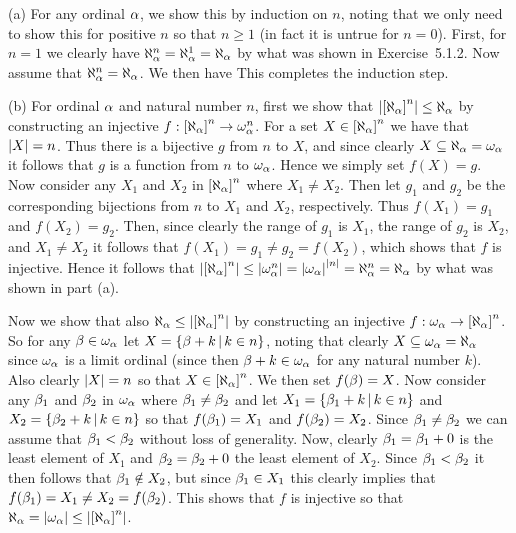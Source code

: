 \begin{solution}
    \newcommand\nss[1]{\squares{\al_\a}^{#1}}
    \def\wss{\squares{\al_\a}^{<\w}}
	(a) For any ordinal $\alpha$, we show this by induction on $n$, noting that we only need to show this for positive $n$ so that $n \geq 1$ (in fact it is untrue for $n=0$).
    First, for $n=1$ we clearly have $\aleph_\alpha^n = \aleph_\alpha^1 = \aleph_\alpha$ by what was shown in Exercise~5.1.2.
    Now assume that $\aleph_\alpha^n = \aleph_\alpha$.
    We then have
    This completes the induction step. \qedsymbol

    (b) For ordinal $\alpha$ and natural number $n$, first we show that $\abs{\nss{n}} \leq \al_\a$ by constructing an injective $f : \nss{n} \to \w_\a^n$.
    For a set $X \in \nss{n}$ we have that $\left| X \right| = n$.
    Thus there is a bijective $g$ from $n$ to $X$, and since clearly $X \subseteq \aleph_\alpha = \omega_\alpha$ it follows that $g$ is a function from $n$ to $\omega_\alpha$.
    Hence we simply set $f(X) = g$.
    Now consider any $X_1$ and $X_2$ in $\nss{n}$ where $X_1 \neq X_2$.
    Then let $g_1$ and $g_2$ be the corresponding bijections from $n$ to $X_1$ and $X_2$, respectively.
    Thus $f(X_1) = g_1$ and $f(X_2) = g_2$.
    Then, since clearly the range of $g_1$ is $X_1$, the range of $g_2$ is $X_2$, and $X_1 \neq X_2$ it follows that $f(X_1) = g_1 \neq g_2 = f(X_2)$, which shows that $f$ is injective.
    Hence it follows that $\abs{\nss{n}} \leq \abs{\w_\a^n} = \abs{\w_\a}^{\abs{n}} = \al_\a^n = \al_\a$ by what was shown in part (a).

    Now we show that also $\al_\a \leq \abs{\nss{n}}$ by constructing an injective $f : \w_\a \to \nss{n}$.
    So for any $\beta \in \omega_\alpha$ let $X = \left\{ \beta + k \,|\, k \in n \right\}$, noting that clearly $X \subseteq \omega_\alpha = \aleph_\alpha$ since $\omega_\alpha$ is a limit ordinal (since then $\beta + k \in \omega_\alpha$ for any natural number $k$).
    Also clearly $\left| X \right| = n$ so that $X \in \nss{n}$.
    We then set $f(\beta) = X$.
    Now consider any $\beta_1$ and $\beta_2$ in $\omega_\alpha$ where $\beta_1 \neq \beta_2$ and let $X_1 = \left\{ \beta_1 + k \,|\, k \in n \right\}$ and $X_2 = \left\{ \beta_2 + k \,|\, k \in n \right\}$ so that $f(\beta_1) = X_1$ and $f(\beta_2) = X_2$.
    Since $\beta_1 \neq \beta_2$ we can assume that $\beta_1 < \beta_2$ without loss of generality.
    Now, clearly $\beta_1 = \beta_1 + 0$ is the least element of $X_1$ and $\beta_2 = \beta_2 + 0$ the least element of $X_2$.
    Since $\beta_1 < \beta_2$ it then follows that $\beta_1 \notin X_2$, but since $\beta_1 \in X_1$ this clearly implies that $f(\beta_1) = X_1 \neq X_2 = f(\beta_2)$.
    This shows that $f$ is injective so that $\al_\a = \abs{\w_\a} \leq \abs{\nss{n}}$.


\end{solution}
